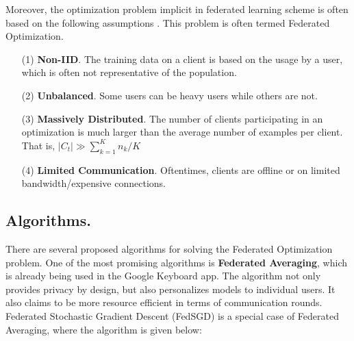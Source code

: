 \documentclass[12pt]{article}
\begin{document}
	\noindent Moreover, the optimization problem implicit in federated learning scheme is often based on the following assumptions \cite{fml}. This problem is often termed Federated Optimization.
	\begin{enumerate}
	    \item[(1)] \textbf{Non-IID}. The training data on a client is based on the usage by a user, which is often not representative of the population.
	    \item[(2)] \textbf{Unbalanced}. Some users can be heavy users while others are not.
	    \item[(3)] \textbf{Massively Distributed}. The number of clients participating in an optimization is much larger than the average number of examples per client. That is, $|C_t| \gg \sum_{k=1}^K n_k / K$
	    \item[(4)] \textbf{Limited Communication}. Oftentimes, clients are offline or on limited bandwidth/expensive connections.
	\end{enumerate}
	
	\vspace{3mm}
	
	\subsection*{Algorithms.}
	\noindent There are several proposed algorithms for solving the Federated Optimization problem. One of the most promising algorithms is \textbf{Federated Averaging}, which is already being used in the Google Keyboard app. The algorithm not only provides privacy by design, but also personalizes models to individual users. It also claims to be more resource efficient in terms of communication rounds. Federated Stochastic Gradient Descent (FedSGD) is a special case of Federated Averaging, where the algorithm is given below:\cite{fml}
	
\end{document}
